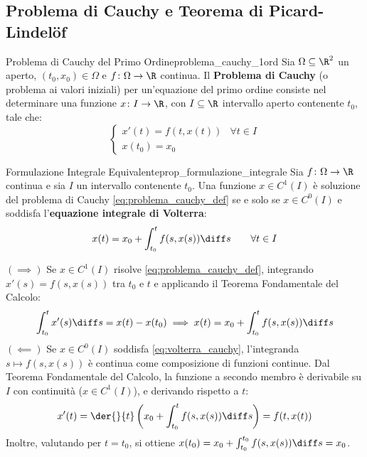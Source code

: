 \subsection{Problema di Cauchy e Teorema di Picard-Lindelöf}

\begin{definizione}{Problema di Cauchy del Primo Ordine}{problema_cauchy_1ord}
Sia $\Omega \subseteq \R^2$ un aperto, $(t_0, x_0) \in \Omega$ e $f \colon \Omega \to \R$ continua. Il \textbf{Problema di Cauchy} (o problema ai valori iniziali) per un'equazione del primo ordine consiste nel determinare una funzione $x \colon I \to \R$, con $I \subseteq \R$ intervallo aperto contenente $t_0$, tale che:
\begin{equation}
    \label{eq:problema_cauchy_def}
    \begin{cases}
        x'(t) = f(t, x(t)) & \forall t \in I \\
        x(t_0) = x_0
    \end{cases}
\end{equation}
\end{definizione}

\begin{proposizione}{Formulazione Integrale Equivalente}{prop_formulazione_integrale}
Sia $f \colon \Omega \to \R$ continua e sia $I$ un intervallo contenente $t_0$. Una funzione $x \in C^1(I)$ è soluzione del problema di Cauchy \eqref{eq:problema_cauchy_def} se e solo se $x \in C^0(I)$ e soddisfa l'\textbf{equazione integrale di Volterra}:
\begin{equation}
    \label{eq:volterra_cauchy}
    x(t) = x_0 + \int_{t_0}^t f(s, x(s)) \diff s \qquad \forall t \in I
\end{equation}
\end{proposizione}

\begin{dimostrazione}
$(\implies)$ Se $x \in C^1(I)$ risolve \eqref{eq:problema_cauchy_def}, integrando $x'(s) = f(s, x(s))$ tra $t_0$ e $t$ e applicando il Teorema Fondamentale del Calcolo:
\[
    \int_{t_0}^t x'(s) \diff s = x(t) - x(t_0) \implies x(t) = x_0 + \int_{t_0}^t f(s, x(s)) \diff s
\]
$(\impliedby)$ Se $x \in C^0(I)$ soddisfa \eqref{eq:volterra_cauchy}, l'integranda $s \mapsto f(s, x(s))$ è continua come composizione di funzioni continue. Dal Teorema Fondamentale del Calcolo, la funzione a secondo membro è derivabile su $I$ con continuità ($x \in C^1(I)$), e derivando rispetto a $t$:
\[
    x'(t) = \der{}{t} \left( x_0 + \int_{t_0}^t f(s, x(s)) \diff s \right) = f(t, x(t))
\]
Inoltre, valutando per $t = t_0$, si ottiene $x(t_0) = x_0 + \int_{t_0}^{t_0} f(s, x(s))\diff s = x_0$.
\end{dimostrazione}

